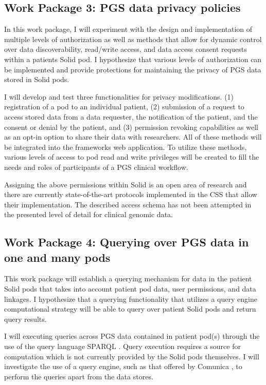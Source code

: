 \documentclass[runningheads]{llncs}
\begin{document}
\subsection{Work Package 3: PGS data privacy policies}

In this work package, I will experiment with the design and implementation of multiple levels of authorization as well as methods that allow for dynamic control over data discoverability, read/write access, and data access consent requests within a patient\textquotesingle s Solid pod. 
I hypothesize that various levels of authorization can be implemented and provide protections for maintaining the privacy of PGS data stored in Solid pods.

I will develop and test three functionalities for privacy modifications.
(1) registration of a pod to an individual patient,
(2) submission of a request to access stored data from a data requester, the notification of the patient, and the consent or denial by the patient, and
(3) permission revoking capabilities as well as an opt-in option to share their data with researchers. 
All of these methods will be integrated into the framework\textquotesingle s web application.
To utilize these methods, various levels of access to pod read and write privileges will be created to fill the needs and roles of participants of a PGS clinical workflow. 

Assigning the above permissions within Solid is an open area of research and there are currently state-of-the-art protocols implemented in the CSS that allow their implementation.
The described access schema has not been attempted in the presented level of detail for clinical genomic data.


\subsection{Work Package 4: Querying over PGS data in one and many pods}

This work package will establish a querying mechanism for data in the patient Solid pods that takes into account patient pod data, user permissions, and data linkages. 
I hypothesize that a querying functionality that utilizes a query engine computational strategy will be able to query over patient Solid pods and return query results.

I will executing queries across PGS data contained in patient pod(s) through the use of the query language SPARQL \cite{noauthor_sparql_nodate}.
Query execution requires a source for computation which is not currently provided by the Solid pods themselves.
I will investigate the use of a query engine, such as that offered by Comunica \cite{comunica}, to perform the queries apart from the data stores.
\end{document}
